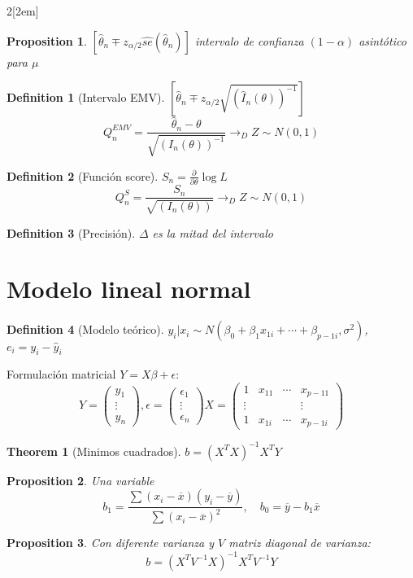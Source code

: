 \documentclass[leqno]{article}
\newtheorem*{theorem}{Theorem}
\newtheorem*{proposition}{Proposition}
\newtheorem*{definition}{Definition}
\begin{document}
\begin{multicols}{2}[\columnsep2em]
\begin{proposition}$[\hat{\theta }_n \mp z_{\alpha /2}\hat{se}(\hat{\theta }_n)]$ intervalo de confianza $(1-\alpha )$ asintótico para $\mu$
\end{proposition}

\begin{definition}[Intervalo EMV] $\left[\hat{\theta }_n \mp z_{\alpha /2} \sqrt{(\hat{I}_n(\theta ))^{-1}} \right]$
  \[
	Q_n^{EMV} = \frac{\hat{\theta }_n-\theta }{\sqrt{(I_n(\theta ))^{-1}} } \to _D Z \sim N(0,1)
  \] 
\end{definition}

\begin{definition}[Función score] $S_n = \frac{\partial}{\partial \theta } \log L$
  \[
	Q_n^{S} = \frac{S_n}{\sqrt{(I_n(\theta ))} } \to _D Z \sim N(0,1)
  \] 
\end{definition}

\begin{definition}[Precisión] $\Delta $ es la mitad del intervalo
\end{definition}


\section{Modelo lineal normal}

\begin{definition}[Modelo teórico] $y_i|x_i \sim N(\beta _0+ \beta_1x_{1i}+ \cdots + \beta_{p-1i}, \sigma ^2)$, $e_i = y_i-\hat{y}_i$
\end{definition}

Formulación matricial $Y = X\beta + \epsilon$:
\[
Y = \begin{pmatrix} y_1 \\ \vdots \\ y_n \end{pmatrix} , \epsilon = \begin{pmatrix} \epsilon_1\\ \vdots \\ \epsilon_n \end{pmatrix} 
X = \begin{pmatrix} 1 & x_{11} & \cdots & x_{p-11} \\ \vdots & & & \vdots \\ 1 & x_{1i} & \cdots & x_{p-1i} \end{pmatrix} 
\] 
\begin{theorem}[Minimos cuadrados] $ b = (X^TX)^{-1}X^TY$
\end{theorem}

\begin{proposition} Una variable
\[
b_1 = \frac{\sum (x_i-\overline{x})(y_i-\overline{y})}{\sum (x_i-\overline{x})^2}, \quad b_0 = \overline{y} - b_1 \overline{x}
\]  
\end{proposition}

\begin{proposition} Con diferente varianza y $V$ matriz diagonal de varianza:
\[
b = (X^TV^{-1}X)^{-1}X^TV^{-1}Y
\] 
\end{proposition}






\end{multicols}
\end{document}
